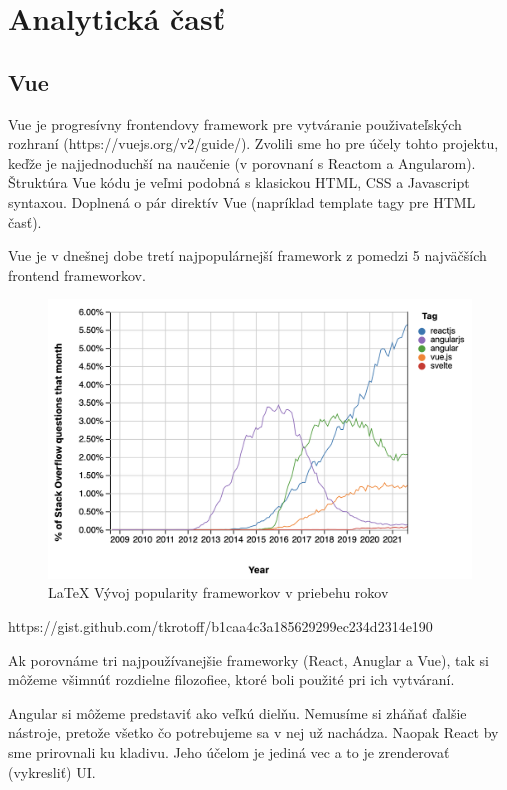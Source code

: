 
\chapter{Analytická časť}

\section{Vue}
Vue je progresívny frontendovy framework pre vytváranie použivateľských rozhraní (https://vuejs.org/v2/guide/). Zvolili sme ho pre účely tohto projektu, keďže je najjednoduchší na naučenie (v porovnaní s Reactom a Angularom). Štruktúra Vue kódu je veľmi podobná s klasickou HTML, CSS a Javascript syntaxou. Doplnená o pár direktív Vue (napríklad template tagy pre HTML časť).

Vue je v dnešnej dobe tretí najpopulárnejší framework z pomedzi 5 najväčších frontend frameworkov. 

\begin{figure}[!ht]
  \centering
  \includegraphics[width=.9\textwidth]{figures/frameworks.png}
  \caption{\LaTeX{} Vývoj popularity frameworkov v priebehu rokov \label{o:Vývoj popularity frameworkov v priebehu rokov}}
\end{figure}
https://gist.github.com/tkrotoff/b1caa4c3a185629299ec234d2314e190

Ak porovnáme tri najpoužívanejšie frameworky (React, Anuglar a Vue), tak si môžeme všimnúť rozdielne filozofiee, ktoré boli použité pri ich vytváraní. 

Angular si môžeme predstaviť ako veľkú dielňu. Nemusíme si zháňať ďalšie nástroje, pretože všetko čo potrebujeme sa v nej už nachádza. Naopak React by sme prirovnali ku kladivu. Jeho účelom je jediná vec a to je zrenderovať (vykresliť) UI. 

